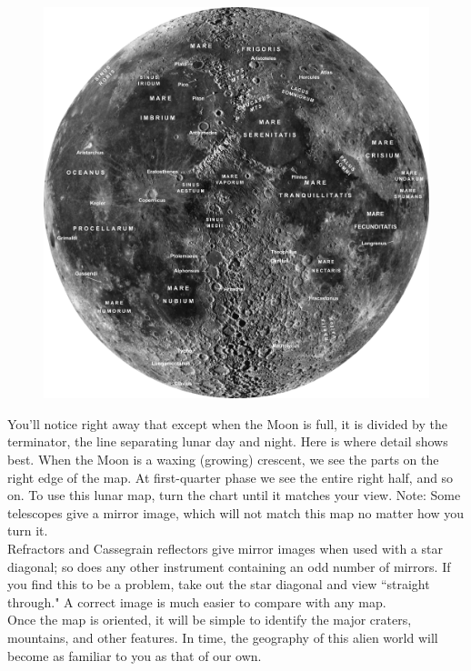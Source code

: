 \documentclass[a4paper,12pt]{extarticle}
\begin{document}
\begin{figure}[H]
	\centering
	\includegraphics[width=0.9\linewidth]{moon1.png}
\end{figure}
You'll notice right away that except when the Moon is full, it is divided by the terminator, the line separating lunar day and night. Here is where detail shows best. When the Moon is a waxing (growing) crescent, we see the parts on the right edge of the map. At first-quarter phase we see the entire right half, and so on. To use this lunar map, turn the chart until it matches your view. Note: Some telescopes give a mirror image, which will not match this map no matter how you turn it.\\

Refractors and Cassegrain reflectors give mirror images when used with a star diagonal; so does any other instrument containing an odd number of mirrors. If you find this to be a problem, take out the star diagonal and view ``straight through." A correct image is much easier to compare with any map.\\

Once the map is oriented, it will be simple to identify the major craters, mountains, and other features. In time, the geography of this alien world will become as familiar to you as that of our own.
\end{document}
